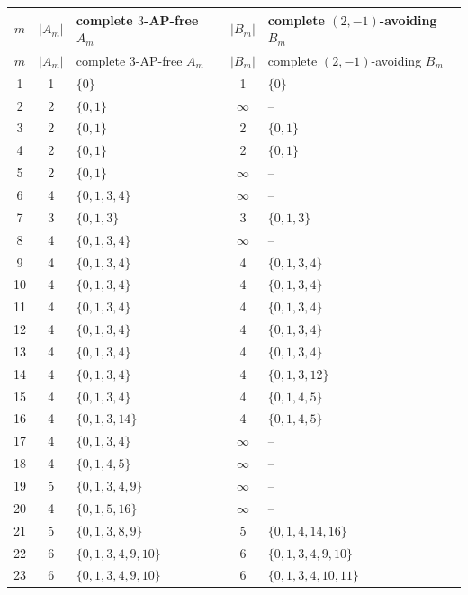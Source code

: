 \documentclass[11pt]{article}
\begin{document}
	
	\begin{center}
		\tiny
		\setlength{\tabcolsep}{2pt}
		\begin{longtable}{c c >{\raggedright\arraybackslash}p{} c >{\raggedright\arraybackslash}p{}}
			\toprule
			$m$ & $|A_m|$ & complete $3$-AP-free $A_m$ & $|B_m|$ & complete $(2,-1)$-avoiding $B_m$ \\
			\midrule
			\endfirsthead
			\toprule
			$m$ & $|A_m|$ & complete $3$-AP-free $A_m$ & $|B_m|$ & complete $(2,-1)$-avoiding $B_m$ \\
			\midrule
			\endhead
			1 & 1 & \(\{0\}\) & 1 & \(\{0\}\) \\
			2 & 2 & \(\{0,1\}\) & \(\infty\) & -- \\
			3 & 2 & \(\{0,1\}\) & 2 & \(\{0,1\}\) \\
			4 & 2 & \(\{0,1\}\) & 2 & \(\{0,1\}\) \\
			5 & 2 & \(\{0,1\}\) & \(\infty\) & -- \\
			6 & 4 & \(\{0,1,3,4\}\) & \(\infty\) & -- \\
			7 & 3 & \(\{0,1,3\}\) & 3 & \(\{0,1,3\}\) \\
			8 & 4 & \(\{0,1,3,4\}\) & \(\infty\) & -- \\
			9 & 4 & \(\{0,1,3,4\}\) & 4 & \(\{0,1,3,4\}\) \\
			10 & 4 & \(\{0,1,3,4\}\) & 4 & \(\{0,1,3,4\}\) \\
			11 & 4 & \(\{0,1,3,4\}\) & 4 & \(\{0,1,3,4\}\) \\
			12 & 4 & \(\{0,1,3,4\}\) & 4 & \(\{0,1,3,4\}\) \\
			13 & 4 & \(\{0,1,3,4\}\) & 4 & \(\{0,1,3,4\}\) \\
			14 & 4 & \(\{0,1,3,4\}\) & 4 & \(\{0,1,3,12\}\) \\
			15 & 4 & \(\{0,1,3,4\}\) & 4 & \(\{0,1,4,5\}\) \\
			16 & 4 & \(\{0,1,3,14\}\) & 4 & \(\{0,1,4,5\}\) \\
			17 & 4 & \(\{0,1,3,4\}\) & \(\infty\) & -- \\
			18 & 4 & \(\{0,1,4,5\}\) & \(\infty\) & -- \\
			19 & 5 & \(\{0,1,3,4,9\}\) & \(\infty\) & -- \\
			20 & 4 & \(\{0,1,5,16\}\) & \(\infty\) & -- \\
			21 & 5 & \(\{0,1,3,8,9\}\) & 5 & \(\{0,1,4,14,16\}\) \\
			22 & 6 & \(\{0,1,3,4,9,10\}\) & 6 & \(\{0,1,3,4,9,10\}\) \\
			23 & 6 & \(\{0,1,3,4,9,10\}\) & 6 & \(\{0,1,3,4,10,11\}\) \\

\end{longtable}
\end{center}
\end{document}
